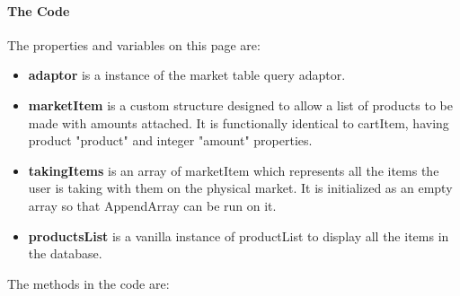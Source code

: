 ﻿\documentclass{article}
\begin{document}
    \paragraph{The Code}
    The properties and variables on this page are:
    \begin{itemize}
        \item \textbf{adaptor} is a instance of the market table query adaptor.
        \item \textbf{marketItem} is a custom structure designed to allow a list of products to be made with amounts attached.
        It is functionally identical to cartItem, having product "product" and integer "amount" properties.
        \item \textbf{takingItems} is an array of marketItem which represents all the items the user is taking with them on the physical market.
        It is initialized as an empty array so that AppendArray can be run on it.
        \item \textbf{productsList} is a vanilla instance of productList to display all the items in the database.
    \end{itemize}
    The methods in the code are:
\end{document}
